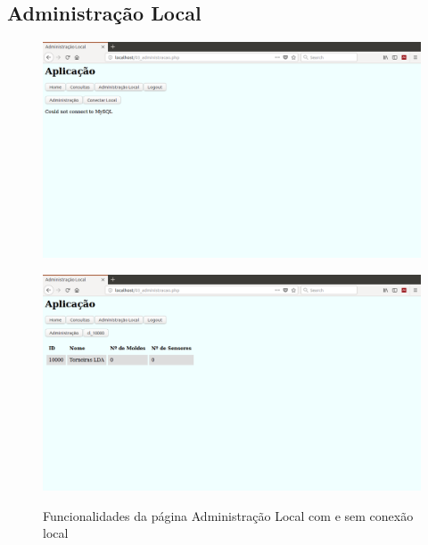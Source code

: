 \documentclass[11pt,twoside,a4paper]{report}
\begin{document}
\subsection{Administração Local}
\begin{figure}[H]
	\centering
	\begin{minipage}{1\textwidth}
		\begin{center}
			\includegraphics[trim={0 13cm 0 0},clip,width=1\textwidth]{administracao01} %
			\label{fig:admin1}
		\end{center}
	\end{minipage}
	\begin{minipage}{1\textwidth}
		\begin{center}
			\includegraphics[trim={0 13cm 0 0},clip,width=1\textwidth]{administracao02} %
			\label{fig:admin2}
		\end{center}
	\end{minipage}
	\caption{Funcionalidades da página Administração Local com e sem conexão local}
	\label{fig:admin0}
\end{figure}
\end{document}
